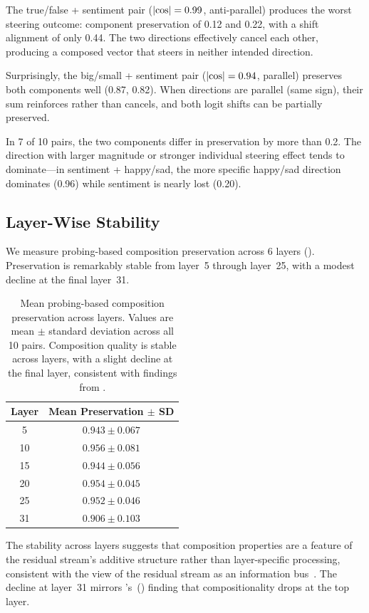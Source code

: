 The true/false + sentiment pair ($|\text{cos}| = 0.99$, anti-parallel) produces
the worst steering outcome: component preservation of 0.12 and 0.22, with a
shift alignment of only 0.44. The two directions effectively cancel each other,
producing a composed vector that steers in neither intended direction.

Surprisingly, the big/small + sentiment pair ($|\text{cos}| = 0.94$, parallel)
preserves both components well (0.87, 0.82). When directions are parallel
(same sign), their sum reinforces rather than cancels, and both logit shifts can
be partially preserved.

In 7 of 10 pairs, the two components differ in preservation by more than 0.2.
The direction with larger magnitude or stronger individual steering effect tends
to dominate---\eg in sentiment + happy/sad, the more specific happy/sad
direction dominates (0.96) while sentiment is nearly lost (0.20).

\subsection{Layer-Wise Stability}
\label{sec:layerwise}

We measure probing-based composition preservation across 6 layers
(). Preservation is remarkably stable from layer~5 through
layer~25, with a modest decline at the final layer~31.

\begin{table}[t]
    \centering
    \caption{Mean probing-based composition preservation across layers. Values
    are mean $\pm$ standard deviation across all 10 pairs. Composition quality
    is stable across layers, with a slight decline at the final layer,
    consistent with findings from \citet{guo2025quantifying}.}
    \begin{tabular}{@{}cc@{}}
        \toprule
        \textbf{Layer} & \textbf{Mean Preservation $\pm$ SD} \\
        \midrule
        5  & $0.943 \pm 0.067$ \\
        10 & $0.956 \pm 0.081$ \\
        15 & $0.944 \pm 0.056$ \\
        20 & $0.954 \pm 0.045$ \\
        25 & $0.952 \pm 0.046$ \\
        31 & $0.906 \pm 0.103$ \\
        \bottomrule
    \end{tabular}
    \label{tab:layers}
\end{table}

The stability across layers suggests that composition properties are a
feature of the residual stream's additive structure rather than
layer-specific processing, consistent with the view of the residual
stream as an information bus~\citep{nanda2023emergent}. The decline at
layer~31 mirrors \citeauthor{guo2025quantifying}'s~(\citeyear{guo2025quantifying})
finding that compositionality drops at the top layer.
